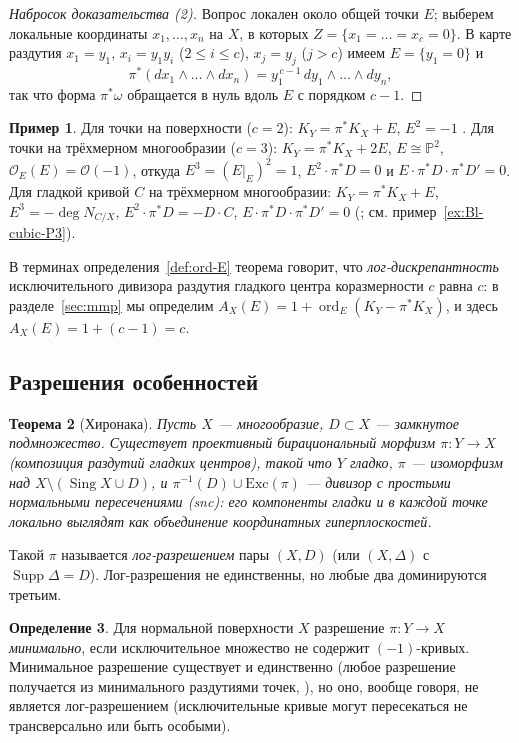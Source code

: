 \documentclass[11pt,a4paper]{article}
\theoremstyle{plain}
\newtheorem{theorem}{Теорема}[section]
\theoremstyle{definition}
\newtheorem{definition}[theorem]{Определение}
\newtheorem{example}[theorem]{Пример}
\theoremstyle{remark}
\newcommand{\PP}{\mathbb{P}}
\newcommand{\cO}{\mathcal{O}}
\DeclareMathOperator{\ord}{ord}
\DeclareMathOperator{\Sing}{Sing}
\DeclareMathOperator{\Supp}{Supp}
\begin{document}
\begin{proof}[Набросок доказательства (2)]
Вопрос локален около общей точки $E$; выберем локальные координаты $x_1,\dots,x_n$ на $X$, в
которых $Z=\{x_1=\dots=x_c=0\}$. В карте раздутия $x_1=y_1$, $x_i=y_1y_i$ ($2\le i\le c$),
$x_j=y_j$ ($j>c$) имеем $E=\{y_1=0\}$ и
\[
\pi^*(dx_1\wedge\dots\wedge dx_n)=y_1^{\,c-1}\,dy_1\wedge\dots\wedge dy_n ,
\]
так что форма $\pi^*\omega$ обращается в нуль вдоль $E$ с порядком $c-1$.
\end{proof}

\begin{example}
Для точки на поверхности ($c=2$): $K_Y=\pi^*K_X+E$, $E^2=-1$ \cite[V.3.2, V.3.3]{Ha}. Для точки на
трёхмерном многообразии ($c=3$): $K_Y=\pi^*K_X+2E$, $E\cong\PP^2$, $\cO_E(E)=\cO(-1)$, откуда
$E^3=(E|_E)^2=1$, $E^2\cdot\pi^*D=0$ и $E\cdot\pi^*D\cdot\pi^*D'=0$. Для гладкой кривой $C$ на
трёхмерном многообразии: $K_Y=\pi^*K_X+E$, $E^3=-\deg N_{C/X}$, $E^2\cdot\pi^*D=-D\cdot C$,
$E\cdot\pi^*D\cdot\pi^*D'=0$ (\cite[IV.6]{Fulton}; см. пример~\ref{ex:Bl-cubic-P3}).
\end{example}

В терминах определения~\ref{def:ord-E} теорема говорит, что \emph{лог-дискрепантность}
исключительного дивизора раздутия гладкого центра коразмерности $c$ равна $c$: в разделе~\ref{sec:mmp}
мы определим $A_X(E)=1+\ord_E(K_Y-\pi^*K_X)$, и здесь $A_X(E)=1+(c-1)=c$.

\subsection{Разрешения особенностей}

\begin{theorem}[Хиронака]\label{thm:Hironaka}
Пусть $X$ --- многообразие, $D\subset X$ --- замкнутое подмножество. Существует проективный
бирациональный морфизм $\pi\colon Y\to X$ \textup{(}композиция раздутий гладких центров\textup{)}, такой что $Y$
гладко, $\pi$ --- изоморфизм над $X\setminus(\Sing X\cup D)$, и $\pi^{-1}(D)\cup\mathrm{Exc}(\pi)$
--- дивизор с \emph{простыми нормальными пересечениями} \textup{(}snc\textup{)}: его компоненты гладки и в каждой
точке локально выглядят как объединение координатных гиперплоскостей.
\end{theorem}

Такой $\pi$ называется \emph{лог-разрешением} пары $(X,D)$ (или $(X,\Delta)$ с $\Supp\Delta=D$).
Лог-разрешения не единственны, но любые два доминируются третьим.

\begin{definition}
Для нормальной поверхности $X$ разрешение $\pi\colon Y\to X$ \emph{минимально}, если
исключительное множество не содержит $(-1)$-кривых. Минимальное разрешение существует и единственно
(любое разрешение получается из минимального раздутиями точек,
\cite[V.5.4]{Ha}), но оно, вообще говоря, не является лог-разрешением (исключительные кривые могут
пересекаться не трансверсально или быть особыми).
\end{definition}
\end{document}
